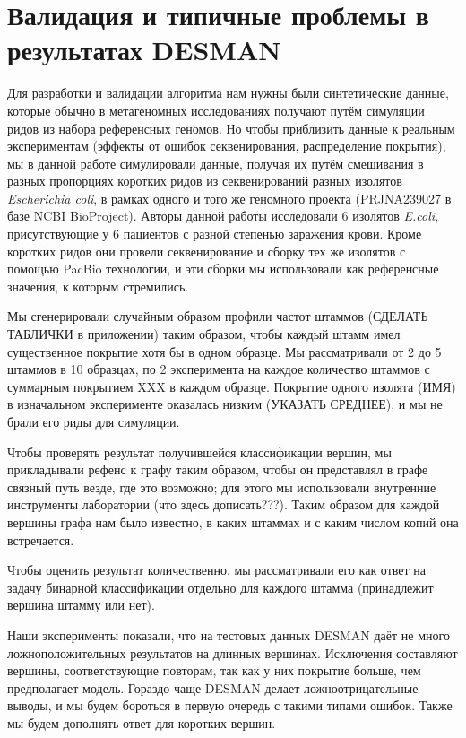 \documentclass{spbau-diploma}
\begin{document}
\section{Валидация и типичные проблемы в результатах DESMAN}

Для разработки и валидации алгоритма нам нужны были синтетические данные, которые обычно в метагеномных исследованиях получают путём симуляции ридов из набора референсных геномов. 
Но чтобы приблизить данные к реальным экспериментам (эффекты от ошибок секвенирования, распределение покрытия), мы в данной работе симулировали данные, получая их путём смешивания в разных пропорциях коротких ридов из секвенирований разных изолятов \textit{Escherichia coli}, в рамках одного и того же геномного проекта (PRJNA239027 в базе NCBI BioProject). Авторы данной работы \cite{isolates} исследовали 6 изолятов \textit{E.coli}, присутствующие у 6 пациентов с разной степенью заражения крови. Кроме коротких ридов они провели секвенирование и сборку тех же изолятов с помощью PacBio технологии, и эти сборки мы использовали как референсные значения, к которым стремились.

Мы сгенерировали случайным образом профили частот штаммов (СДЕЛАТЬ ТАБЛИЧКИ в приложении) таким образом, чтобы каждый штамм имел существенное покрытие хотя бы в одном образце. Мы рассматривали от 2 до 5 штаммов в 10 образцах, по 2 эксперимента на каждое количество штаммов с суммарным покрытием XXX в каждом образце. Покрытие одного изолята (ИМЯ) в изначальном эксперименте оказалась низким (УКАЗАТЬ СРЕДНЕЕ), и мы не брали его риды для симуляции.

Чтобы проверять результат получившейся классификации вершин, мы прикладывали рефенс к графу таким образом, чтобы он представлял в графе связный путь везде, где это возможно; для этого мы использовали внутренние инструменты лаборатории (что здесь дописать???). Таким образом для каждой вершины графа нам было известно, в каких штаммах и с каким числом копий она встречается.

Чтобы оценить результат количественно, мы рассматривали его как ответ на задачу бинарной классификации отдельно для каждого штамма (принадлежит вершина штамму или нет).

Наши эксперименты показали, что на тестовых данных DESMAN даёт не много ложноположительных результатов на длинных вершинах. Исключения составляют вершины, соответствующие повторам, так как у них покрытие больше, чем предполагает модель. Гораздо чаще DESMAN делает ложноотрицательные выводы, и мы будем бороться в первую очередь с такими типами ошибок. Также мы будем дополнять ответ для коротких вершин.
\end{document}
